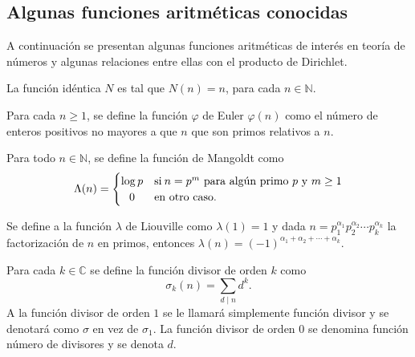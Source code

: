 \subsection{Algunas funciones aritméticas conocidas}

A continuación se presentan algunas funciones aritméticas de interés en teoría de números y algunas relaciones entre ellas con el producto de Dirichlet.

\begin{definition}
La función idéntica $N$ es tal que $N(n)=n$, para cada $n\in \mathbb{N}$.
\end{definition}

\begin{definition}
Para cada $n\geq 1$, se define la función $\varphi$ de Euler $\varphi(n)$ como el número de enteros positivos no mayores a que $n$ que son primos relativos a $n$.
\end{definition}

\begin{definition}
Para todo $n\in\mathbb{N}$, se define la función de Mangoldt como 
\begin{equation*}
	\Lambda(n) =
		\begin{cases}
			\log p & \text{si} \: n=p^m \text{ para algún primo } p \text{ y } m\geq 1\\ \hfil
			0 & \text{en otro caso}.
		\end{cases}
\end{equation*}
\end{definition}

\begin{definition}
Se define a la función $\lambda$ de Liouville como $\lambda(1)=1$ y dada $n=p_1^{\alpha_1}p_2^{\alpha_2}\cdots p_k^{\alpha_k}$ la factorización de $n$ en primos, entonces $\lambda(n)=(-1)^{\alpha_1+\alpha_2+\cdots+\alpha_k}$.
\end{definition}

\begin{definition}
Para cada $k\in\mathbb{C}$ se define la función divisor de orden $k$ como 
\begin{equation*}
	\sigma_k(n)=\sum_{d \mid n} d^k.
\end{equation*}
A la función divisor de orden $1$ se le llamará simplemente función divisor y se denotará como $\sigma$ en vez de $\sigma_1$. La función divisor de orden $0$ se denomina función número de divisores y se denota $d$.
\end{definition}

